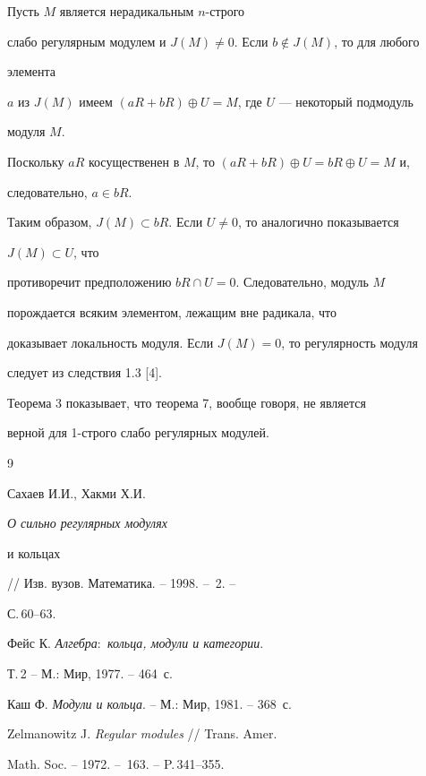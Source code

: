  


\begin{pf} 


Пусть $M$ является нерадикальным $n$-строго 


слабо регулярным модулем и $J(M)\ne0$. Если $b\notin J(M)$, то для любого 


элемента 


$a$ из $J(M)$ имеем $(aR+bR)\oplus U=M$, где $U$ --- некоторый подмодуль 


модуля $M$. 


Поскольку $aR$ косущественен в $M$, то $(aR+bR)\oplus U=bR\oplus U=M$ и, 


следовательно, $a\in bR$. 


Таким образом, $J(M)\subset bR$. Если $U\ne0$, то аналогично показывается 


$J(M)\subset U$, что 


противоречит предположению $bR\cap U=0$. Следовательно, модуль $M$ 


порождается всяким элементом, лежащим вне радикала, что 


доказывает локальность модуля. Если $J(M){=}0$, то регулярность модуля 


следует из следствия 1.3 [4]. 


\end{pf} 


 


Теорема 3 показывает, что теорема 7, вообще говоря, не является 


верной для 1-строго слабо регулярных модулей. 


 


\begin{thebibliography}{9} 


 




Сахаев И.И., Хакми Х.И. {\em О сильно регулярных модулях 


и кольцах} // Изв. вузов. Математика. -- 1998. -- \No\,2. -- 


С.\,60--63. 




Фейс К. {\em Алгебра$:$ кольца, модули и категории}. 


Т.\,2 -- М.: Мир, 1977. -- 464~с. 




Каш Ф. {\em Модули и кольца}. -- М.: Мир, 1981. -- 368~с. 




Zelmanowitz J. {\em Regular modules} // Trans. Amer. 


Math. Soc. -- 1972. -- \No\,163. -- P.\,341--355. 


 


\end{thebibliography} 


